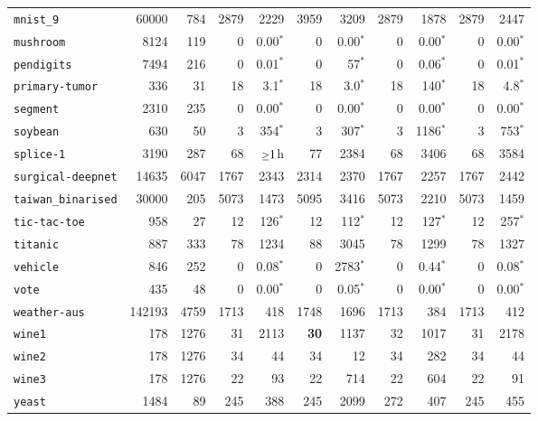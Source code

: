 \begin{tabular}{lccrrrrrrrr}
\texttt{mnist\_9} & \multicolumn{1}{r}{60000} & \multicolumn{1}{r}{784}  & 2879 & 2229 & 3959 & 3209 & 2879 & 1878 & 2879 & 2447\\
\texttt{mushroom} & \multicolumn{1}{r}{8124} & \multicolumn{1}{r}{119}  & 0 & 0.00$^*$ & 0 & 0.00$^*$ & 0 & 0.00$^*$ & 0 & 0.00$^*$\\
\texttt{pendigits} & \multicolumn{1}{r}{7494} & \multicolumn{1}{r}{216}  & 0 & 0.01$^*$ & 0 & 57$^*$ & 0 & 0.06$^*$ & 0 & 0.01$^*$\\
\texttt{primary-tumor} & \multicolumn{1}{r}{336} & \multicolumn{1}{r}{31}  & 18 & 3.1$^*$ & 18 & 3.0$^*$ & 18 & 140$^*$ & 18 & 4.8$^*$\\
\texttt{segment} & \multicolumn{1}{r}{2310} & \multicolumn{1}{r}{235}  & 0 & 0.00$^*$ & 0 & 0.00$^*$ & 0 & 0.00$^*$ & 0 & 0.00$^*$\\
\texttt{soybean} & \multicolumn{1}{r}{630} & \multicolumn{1}{r}{50}  & 3 & 354$^*$ & 3 & 307$^*$ & 3 & 1186$^*$ & 3 & 753$^*$\\
\texttt{splice-1} & \multicolumn{1}{r}{3190} & \multicolumn{1}{r}{287}  & 68 & $\mathsmaller{\geq}1$h & 77 & 2384 & 68 & 3406 & 68 & 3584\\
\texttt{surgical-deepnet} & \multicolumn{1}{r}{14635} & \multicolumn{1}{r}{6047}  & 1767 & 2343 & 2314 & 2370 & 1767 & 2257 & 1767 & 2442\\
\texttt{taiwan\_binarised} & \multicolumn{1}{r}{30000} & \multicolumn{1}{r}{205}  & 5073 & 1473 & 5095 & 3416 & 5073 & 2210 & 5073 & 1459\\
\texttt{tic-tac-toe} & \multicolumn{1}{r}{958} & \multicolumn{1}{r}{27}  & 12 & 126$^*$ & 12 & 112$^*$ & 12 & 127$^*$ & 12 & 257$^*$\\
\texttt{titanic} & \multicolumn{1}{r}{887} & \multicolumn{1}{r}{333}  & 78 & 1234 & 88 & 3045 & 78 & 1299 & 78 & 1327\\
\texttt{vehicle} & \multicolumn{1}{r}{846} & \multicolumn{1}{r}{252}  & 0 & 0.08$^*$ & 0 & 2783$^*$ & 0 & 0.44$^*$ & 0 & 0.08$^*$\\
\texttt{vote} & \multicolumn{1}{r}{435} & \multicolumn{1}{r}{48}  & 0 & 0.00$^*$ & 0 & 0.05$^*$ & 0 & 0.00$^*$ & 0 & 0.00$^*$\\
\texttt{weather-aus} & \multicolumn{1}{r}{142193} & \multicolumn{1}{r}{4759}  & 1713 & 418 & 1748 & 1696 & 1713 & 384 & 1713 & 412\\
\texttt{wine1} & \multicolumn{1}{r}{178} & \multicolumn{1}{r}{1276}  & 31 & 2113 & \textbf{30} & 1137 & 32 & 1017 & 31 & 2178\\
\texttt{wine2} & \multicolumn{1}{r}{178} & \multicolumn{1}{r}{1276}  & 34 & 44 & 34 & 12 & 34 & 282 & 34 & 44\\
\texttt{wine3} & \multicolumn{1}{r}{178} & \multicolumn{1}{r}{1276}  & 22 & 93 & 22 & 714 & 22 & 604 & 22 & 91\\
\texttt{yeast} & \multicolumn{1}{r}{1484} & \multicolumn{1}{r}{89}  & 245 & 388 & 245 & 2099 & 272 & 407 & 245 & 455\\
\bottomrule
\end{tabular}
